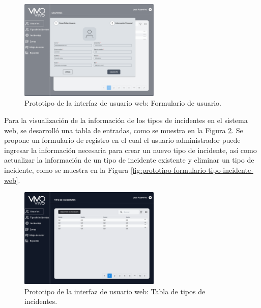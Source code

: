 \begin{figure}[H]
    \centering
    \includegraphics[width=0.6\textwidth]{chapters/III-resultados-y-discusion/resources/images/prototipo-formulario-usuario-web.png}
    \caption{Prototipo de la interfaz de usuario web: Formulario de usuario.}
    \label{fig:prototipo-formulario-usuario-web}
\end{figure}

Para la visualización de la información de los tipos de incidentes en el sistema web, se desarrolló una tabla de entradas, como se muestra en la Figura
\ref{fig:prototipo-tabla-tipos-incidentes-web}. Se propone un formulario de registro en el cual el usuario administrador puede ingresar la información
necesaria para crear un nuevo tipo de incidente, así como actualizar la información de un tipo de incidente existente y eliminar un tipo de incidente,
como se muestra en la Figura \ref{fig:prototipo-formulario-tipo-incidente-web}.

\begin{figure}[H]
    \centering
    \includegraphics[width=0.6\textwidth]{chapters/III-resultados-y-discusion/resources/images/prototipo-tabla-tipos-incidentes-web.png}
    \caption{Prototipo de la interfaz de usuario web: Tabla de tipos de incidentes.}
    \label{fig:prototipo-tabla-tipos-incidentes-web}
\end{figure}

